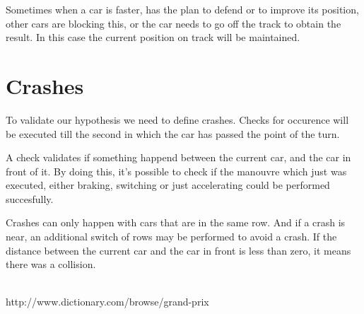 \documentclass{article}
\begin{document}
Sometimes when a car is faster, has the plan to defend or to improve its position, other cars are blocking this, or the car needs to go off the track to obtain the result. In this case the current position on track will be maintained.

\section{Crashes}
To validate our hypothesis we need to define crashes. Checks for occurence will be executed till the second in which the car has passed the point of the turn.

A check validates if something happend between the current car, and the car in front of it. By doing this, it's possible to check if the manouvre which just was executed, either braking, switching or just accelerating could be performed succesfully.

Crashes can only happen with cars that are in the same row. And if a crash is near, an additional switch of rows may be performed to avoid a crash. If the distance between the current car and the car in front is less than zero, it means there was a collision.

 \\

http://www.dictionary.com/browse/grand-prix
\end{document}
